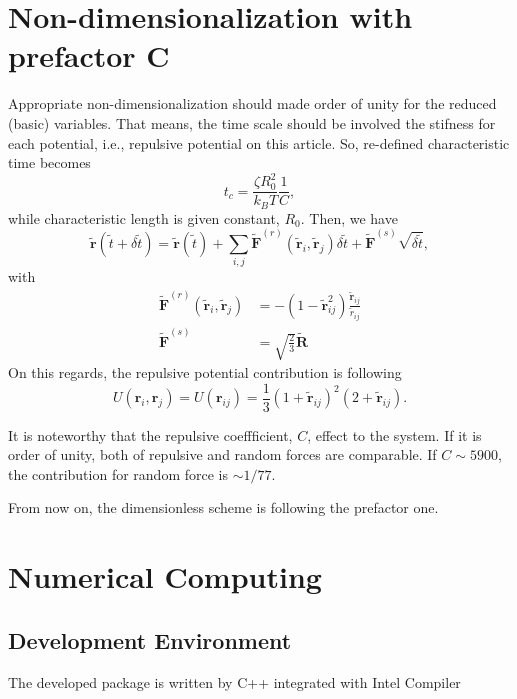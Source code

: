 \documentclass[10pt, a4paper]{article}
\begin{document}
\section{Non-dimensionalization with prefactor C}
Appropriate non-dimensionalization should made order of unity for the reduced (basic) variables. That means, the time scale should be involved the stifness for each potential, i.e., repulsive potential on this article. So, re-defined characteristic time becomes
\begin{equation}
t_c = \frac{\zeta R_0^2}{k_BT}\frac{1}{C},\label{eq:characteristic_time_C}
\end{equation}
while characteristic length is given constant, $R_0$.
Then, we have
\begin{equation}
\tilde{\mathbf{r}}(\tilde{t} + \delta \tilde{t}) = \tilde{\mathbf{r}}(\tilde{t}) + \sum_{i,j}\tilde{\mathbf{F}}^{(r)}(\tilde{\mathbf{r}}_i, \tilde{\mathbf{r}}_j)\delta \tilde{t} + \tilde{\mathbf{F}}^{(s)}\sqrt{\delta\tilde{t}},
\end{equation}
with
\begin{align}
\tilde{\mathbf{F}}^{(r)}(\tilde{\mathbf{r}}_i, \tilde{\mathbf{r}}_j) &= -\left(1-\tilde{\mathbf{r}}_{ij}^2\right)\frac{\tilde{\mathbf{r}}_{ij}}{\tilde{r}_{ij}}\\
\tilde{\mathbf{F}}^{(s)} &= \sqrt{\frac{2}{3}}\tilde{\mathbf{R}}
\end{align}
On this regards, the repulsive potential contribution is following
\begin{equation}
U(\mathbf{r}_i, \mathbf{r}_j) = U(\mathbf{r}_{ij}) = \frac{1}{3}\left(1 + \tilde{\mathbf{r}}_{ij}\right)^2(2 + \tilde{\mathbf{r}}_{ij}).
\end{equation}

It is noteworthy that the repulsive coeffficient, $C$, effect to the system. If it is order of unity, both of repulsive and random forces are comparable. If $C\sim 5900$, the contribution for random force is $\sim 1/77$.

From now on, the dimensionless scheme is following the prefactor one.

\section{Numerical Computing}
\subsection{Development Environment}
The developed package is written by C++ integrated with Intel Compiler 
\end{document}
